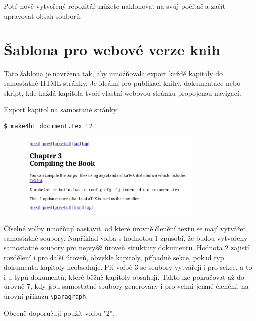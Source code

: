 Poté nově vytvořený repozitář můžete naklonovat na svůj počítač a začít upravovat 
obsah souborů. 

\section{Šablona pro webové verze knih}

Tato šablona je navržena tak, aby umožňovala export každé kapitoly do
samostatné HTML stránky. Je ideální pro publikaci knihy, dokumentace nebo
skript, kde každá kapitola tvoří vlastní webovou stránku propojenou navigací.

\begin{frame}[fragile]{Export kapitol na samostané stránky}
\begin{block}{}
\begin{verbatim}
$ make4ht document.tex "2"
\end{verbatim}
\end{block}

\begin{figure}
  \includegraphics[width=0.8\textwidth]{img/plain-chapter.png}
\end{figure}
\end{frame}

Číselné volby umožňují nastavit, od které úrovně členění textu se mají vytvářet
samostatné soubory. Například volba s hodnotou 1 způsobí, že budou vytvořeny
samostatné soubory pro nejvyšší úroveň struktury dokumentu. Hodnota 2 zajistí
rozdělení i pro další úroveň, obvykle kapitoly, případně sekce, pokud typ
dokumentu kapitoly neobsahuje. Při volbě 3 se soubory vytvářejí i pro sekce, a
to i u typů dokumentů, které běžně kapitoly obsahují. Takto lze pokračovat až
do úrovně 7, kdy jsou samostatné soubory generovány i pro velmi jemné členění,
na úrovní příkazů \verb|\paragraph|.

Obecně doporučuji použít volbu "2".

